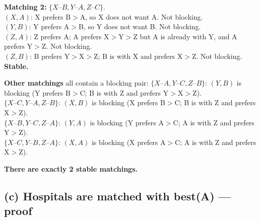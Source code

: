 \documentclass[11pt]{article}
\begin{document}
\textbf{Matching 2:} $\{X\text{--}B, Y\text{--}A, Z\text{--}C\}$.\\
$(X,A)$: X prefers B$>$A, so X does not want A. Not blocking.\\
$(Y,B)$: Y prefers A$>$B, so Y does not want B. Not blocking.\\
$(Z,A)$: Z prefers A; A prefers X$>$Y$>$Z but A is already with Y, and A prefers Y$>$Z. Not blocking.\\
$(Z,B)$: B prefers Y$>$X$>$Z; B is with X and prefers X$>$Z. Not blocking.\\
\textbf{Stable.}

\textbf{Other matchings} all contain a blocking pair:
$\{X\text{--}A, Y\text{--}C, Z\text{--}B\}$: $(Y,B)$ is blocking (Y prefers B$>$C; B is with Z and prefers Y$>$X$>$Z).\\
$\{X\text{--}C, Y\text{--}A, Z\text{--}B\}$: $(X,B)$ is blocking (X prefers B$>$C; B is with Z and prefers X$>$Z).\\
$\{X\text{--}B, Y\text{--}C, Z\text{--}A\}$: $(Y,A)$ is blocking (Y prefers A$>$C; A is with Z and prefers Y$>$Z).\\
$\{X\text{--}C, Y\text{--}B, Z\text{--}A\}$: $(X,A)$ is blocking (X prefers A$>$C; A is with Z and prefers X$>$Z).

\textbf{There are exactly 2 stable matchings.}

\subsection*{(c) Hospitals are matched with best(A) --- proof}
\end{document}
